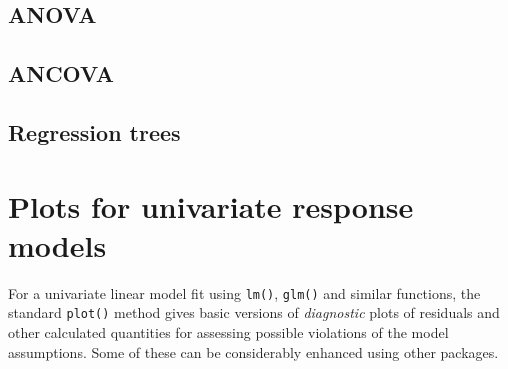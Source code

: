\documentclass[
  letterpaper,
  10pt,
  krantz2]{krantz}
\begin{document}
\section{ANOVA}\label{anova}

\section{ANCOVA}\label{ancova}

\section{Regression trees}\label{regression-trees}


\chapter{Plots for univariate response
models}\label{sec-linear-models-plots}

\renewcommand*{\vec}[1]{\mathbf{#1}}
\newcommand{\trans}{^\mathsf{T}}
\newcommand*{\mat}[1]{\mathbf{#1}}
\newcommand*{\diag}[1]{\mathrm{diag}\, #1}

\renewcommand*{\det}[1]{\mathrm{det}(#1)}
\newcommand*{\rank}[1]{\mathrm{rank} (\mathbf{#1})}
\newcommand*{\trace}[1]{\mathrm{tr} (\mathbf{#1})}
\newcommand*{\dev}[1]{(#1 - \bar{#1})}
\newcommand*{\inv}[1]{\mat{#1}^{-1}}
\newcommand*{\half}[1]{\mat{#1}^{1/2}}
\newcommand*{\invhalf}[1]{\mat{#1}^{-1/2}}
\newcommand*{\nvec}[2]{{#1}_{1}, {#1}_{2},\ldots,{#1}_{#2}}
\newcommand*{\Beta}{\boldsymbol{B}}
\newcommand*{\Epsilon}{\boldsymbol{\Large\varepsilon}}
\newcommand*{\period}{\:\: .}
\newcommand*{\comma}{\:\: ,}
\newcommand*{\given}{\, | \,}
\newcommand*{\Real}[1]{\mathbb{R}^{#1}}
\newcommand*{\degree}[1]{{#1}^{\circ}}

\newcommand{\sizedmat}[2]{\mathord{\mathop{\mat{#1}}\limits_{#2}}}

\renewcommand*{\H}{\mathbf{H}}               
\newcommand*{\E}{\mathbf{E}}
\newcommand*{\widebar}[1]{\overline{#1}}

\newcommand{\Var}{\mathsf{Var}}
\newcommand{\Cov}{\mathsf{Cov}}
\newcommand{\HO}{\mathcal{H}_0}

\newcommand*{\V}{\mathcal{V}}

\newcommand{\pkg}[1]{\textsf{#1}}
\newcommand{\Rpackage}[1]{\pkg{#1} package}

For a univariate linear model fit using \texttt{lm()}, \texttt{glm()}
and similar functions, the standard \texttt{plot()} method gives basic
versions of \emph{diagnostic} plots of residuals and other calculated
quantities for assessing possible violations of the model assumptions.
Some of these can be considerably enhanced using other packages.
\end{document}
